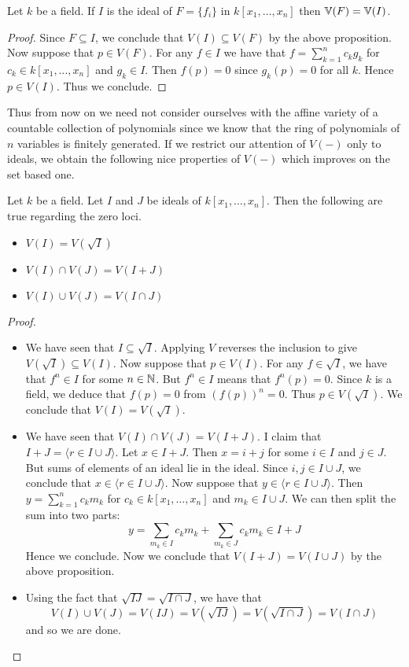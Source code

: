 \documentclass[a4paper]{article}
\begin{document}
\begin{prp}{}{} Let $k$ be a field. If $I$ is the ideal of $F=\{f_i\}$ in $k[x_1,\dots,x_n]$ then $\mathbb{V}(F)=\mathbb{V}(I)$. \tcbline
\begin{proof}
Since $F\subseteq I$, we conclude that $V(I)\subseteq V(F)$ by the above proposition. Now suppose that $p\in V(F)$. For any $f\in I$ we have that $f=\sum_{k=1}^nc_kg_k$ for $c_k\in k[x_1,\dots,x_n]$ and $g_k\in I$. Then $f(p)=0$ since $g_k(p)=0$ for all $k$. Hence $p\in V(I)$. Thus we conclude. 
\end{proof}
\end{prp}

Thus from now on we need not consider ourselves with the affine variety of a countable collection of polynomials since we know that the ring of polynomials of $n$ variables is finitely generated. If we restrict our attention of $V(-)$ only to ideals, we obtain the following nice properties of $V(-)$ which improves on the set based one. 

\begin{prp}{}{} Let $k$ be a field. Let $I$ and $J$ be ideals of $k[x_1,\dots,x_n]$. Then the following are true regarding the zero loci. 
\begin{itemize}
\item $V(I)=V(\sqrt{I})$
\item $V(I)\cap V(J)=V(I+J)$
\item $V(I)\cup V(J)=V(I\cap J)$
\end{itemize}\tcbline
\begin{proof}~\\
\begin{itemize}
\item We have seen that $I\subseteq\sqrt{I}$. Applying $V$ reverses the inclusion to give $V(\sqrt{I})\subseteq V(I)$. Now suppose that $p\in V(I)$. For any $f\in\sqrt{I}$, we have that $f^n\in I$ for some $n\in\mathbb{N}$. But $f^n\in I$ means that $f^n(p)=0$. Since $k$ is a field, we deduce that $f(p)=0$ from $(f(p))^n=0$. Thus $p\in V(\sqrt{I})$. We conclude that $V(I)=V(\sqrt{I})$. 
\item We have seen that $V(I)\cap V(J)=V(I+J)$. I claim that $I+J=\langle r\in I\cup J\rangle$. Let $x\in I+J$. Then $x=i+j$ for some $i\in I$ and $j\in J$. But sums of elements of an ideal lie in the ideal. Since $i,j\in I\cup J$, we conclude that $x\in\langle r\in I\cup J\rangle$. Now suppose that $y\in\langle r\in I\cup J\rangle$. Then $y=\sum_{k=1}^nc_km_k$ for $c_k\in k[x_1,\dots,x_n]$ and $m_k\in I\cup J$. We can then split the sum into two parts: $$y=\sum_{m_k\in I}c_km_k+\sum_{m_k\in J}c_km_k\in I+J$$ Hence we conclude. Now we conclude that $V(I+J)=V(I\cup J)$ by the above proposition. 
\item Using the fact that $\sqrt{IJ}=\sqrt{I\cap J}$, we have that $$V(I)\cup V(J)=V(IJ)=V(\sqrt{IJ})=V(\sqrt{I\cap J})=V(I\cap J)$$ and so we are done. 
\end{itemize}
\end{proof}
\end{prp}
\end{document}
